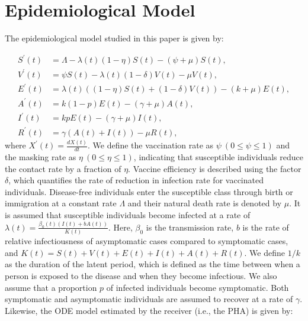 \documentclass[sigconf,review]{acmart}
\begin{document}
\clearpage




\newpage
\label{marker:endmain}
\appendix
\setcounter{table}{0}
\renewcommand{\thetable}{A\arabic{table}}

\setcounter{figure}{0}
\renewcommand{\thefigure}{A\arabic{figure}}

\section{Epidemiological Model}
\label{supp:epi_model}
The epidemiological model studied in this paper is given by:

\begin{align}
S^{\prime}(t) &= \Lambda - \lambda(t)(1-\eta)S(t) - (\psi + \mu)S(t), \nonumber \\
V^{\prime}(t) &= \psi S(t) - \lambda(t)(1-\delta)V(t) - \mu V(t), \nonumber \\
E^{\prime}(t) &= \lambda(t)\left((1-\eta)S(t) + (1-\delta)V(t)\right)- (k+\mu)E(t), \nonumber \\
A^{\prime}(t) &= k(1-p)E(t) - (\gamma+\mu)A(t), \nonumber \\
I^{\prime}(t) &= kpE(t) - (\gamma+\mu)I(t), \nonumber \\
R^{\prime}(t) &= \gamma (A(t) + I(t)) - \mu R(t), \label{eq_ODE}
\end{align}
where $X^{\prime}(t) = \frac{d X(t)}{d t}$. We define the vaccination rate as $\psi\ (0\leq \psi \leq 1)$ and the masking rate as $\eta\ (0\leq \eta \leq 1)$, indicating that susceptible individuals reduce the contact rate by a fraction of $\eta$. 
Vaccine efficiency is described using the factor $\delta$, which quantifies the rate of reduction in infection rate for vaccinated individuals. 
Disease-free individuals enter the susceptible class through birth or immigration at a constant rate $\Lambda$ and their natural death rate is denoted by $\mu$. It is assumed that susceptible individuals become infected at a rate of $\lambda(t) = \frac{\beta_0(t)(I(t)+bA(t))}{K(t)}$. Here, $\beta_0$ is the transmission rate, $b$ is the rate of relative infectiousness of asymptomatic cases compared to symptomatic cases, and $K(t) = S(t) + V(t) + E(t) + I(t) + A(t)+R(t)$. We define $1/k$ as the duration of the latent period, which is defined as the time between when a person is exposed to the disease and when they become infectious. We also assume that a proportion $p$ of infected individuals become symptomatic.  Both symptomatic and asymptomatic individuals are assumed to recover at a rate of $\gamma$. 
Likewise, the ODE model estimated by the receiver (i.e., the PHA) is given by:
\end{document}
